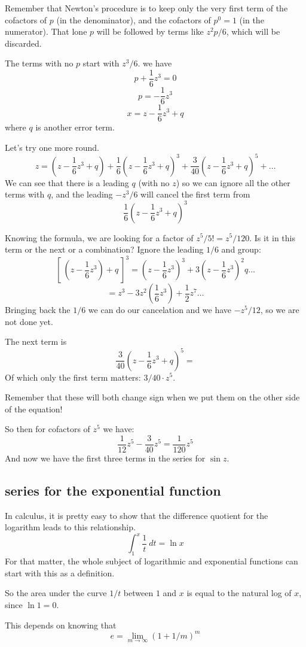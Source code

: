 \documentclass[11pt, oneside]{article}
\begin{document}
Remember that Newton's procedure is to keep only the very first term of the cofactors of $p$ (in the denominator), and the cofactors of $p^0 = 1$ (in the numerator).  That lone $p$ will be followed by terms like $z^2p/6$, which will be discarded.

The terms with no $p$ start with $z^3/6$.  we have
\[ p + \frac{1}{6}z^3 = 0 \]
\[ p = - \frac{1}{6}z^3 \]
\[ x = z - \frac{1}{6}z^3 + q \]
where $q$ is another error term.

Let's try one more round.
\[ z  = (z - \frac{1}{6}z^3 + q) +  \frac{1}{6}(z  - \frac{1}{6}z^3 + q)^3 + \frac{3}{40}(z  - \frac{1}{6}z^3 + q)^5 + \dots   \]
We can see that there is a leading $q$ (with no $z$) so we can ignore all the other terms with $q$, and the leading $-z^3/6$ will cancel the first term from
\[  \frac{1}{6}(z  - \frac{1}{6}z^3 + q)^3 \]

Knowing the formula, we are looking for a factor of $z^5/5! = z^5/120$.  Is it in this term or the next or a combination?  Ignore the leading $1/6$ and group:
\[  [ \ (z  - \frac{1}{6}z^3) + q \ ]^3  = (z  - \frac{1}{6}z^3)^3  + 3(z  - \frac{1}{6}z^3)^2q \dots \]
\[ = z^3 - 3 z^2 (\frac{1}{6}z^3) + \frac{1}{2}z^7 \dots \]
Bringing back the $1/6$ we can do our cancelation and we have $-z^5/12$, so we are not done yet.

The next term is 
\[ \frac{3}{40}(z  - \frac{1}{6}z^3 + q)^5 = \]
Of which only the first term matters:  $3/40 \cdot z^5$.

Remember that these will both change sign when we put them on the other side of the equation!

So then for cofactors of $z^5$ we have:
\[ \frac{1}{12}z^5 -  \frac{3}{40}z^5 = \frac{1}{120}z^5  \]
And now we have the first three terms in the series for $\sin z$.

\subsection*{series for the exponential function}
In calculus, it is pretty easy to show that the difference quotient for the logarithm leads to this relationship.
\[ \int_1^x \frac{1}{t} \ dt = \ln x \]
For that matter, the whole subject of logarithmic and exponential functions can start with this as a definition.

So the area under the curve $1/t$ between $1$ and $x$ is equal to the natural log of $x$, since $\ln 1 = 0$.

This depends on knowing that 
\[ e = \lim_{m \rightarrow \infty} (1 + 1/m)^m \]
\end{document}
